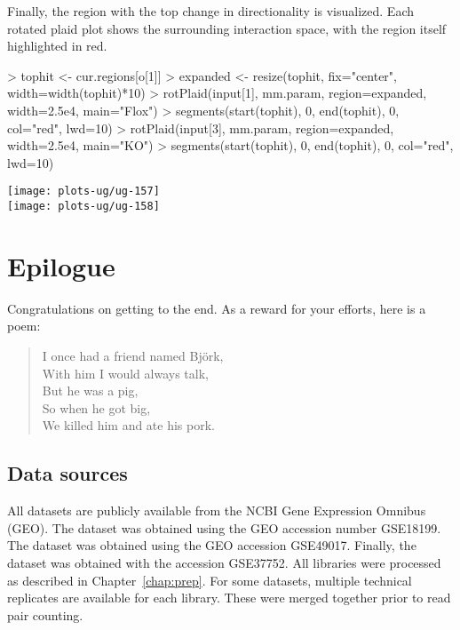 \documentclass[12pt]{report}
\renewenvironment{Schunk}{\vspace{0pt}}{\vspace{0pt}}
\newenvironment{combox}
{ \begin{shaded}\begin{center}\begin{minipage}[t]{0.95\textwidth} }
{ \end{minipage}\end{center}\end{shaded} }
\begin{document}
Finally, the region with the top change in directionality is visualized.
Each rotated plaid plot shows the surrounding interaction space, with the region itself highlighted in red.





\begin{Schunk}
\begin{Sinput}
> tophit <- cur.regions[o[1]]
> expanded <- resize(tophit, fix="center", width=width(tophit)*10)
> rotPlaid(input[1], mm.param, region=expanded, width=2.5e4, main="Flox")
> segments(start(tophit), 0, end(tophit), 0, col="red", lwd=10)
> rotPlaid(input[3], mm.param, region=expanded, width=2.5e4, main="KO")
> segments(start(tophit), 0, end(tophit), 0, col="red", lwd=10)
\end{Sinput}
\end{Schunk}

\begin{center}
\texttt{[image: plots-ug/ug-157]}
\\
\texttt{[image: plots-ug/ug-158]}
\end{center}


\chapter{Epilogue}

\begin{combox}
Congratulations on getting to the end.
As a reward for your efforts, here is a poem:
\begin{quote}
I once had a friend named Bj\"ork, \\
With him I would always talk, \\
But he was a pig, \\
So when he got big, \\
We killed him and ate his pork.
\end{quote}
\end{combox}

\section{Data sources}
All datasets are publicly available from the NCBI Gene Expression Omnibus (GEO).
The \citeauthor{lieberman2009comprehensive} dataset was obtained using the GEO accession number GSE18199.
The \citeauthor{sofueva2013cohesin} dataset was obtained using the GEO accession GSE49017.
Finally, the \citeauthor{rickman2012oncogene} dataset was obtained with the accession GSE37752.
All libraries were processed as described in Chapter~\ref{chap:prep}.
For some datasets, multiple technical replicates are available for each library.
These were merged together prior to read pair counting.
\end{document}
